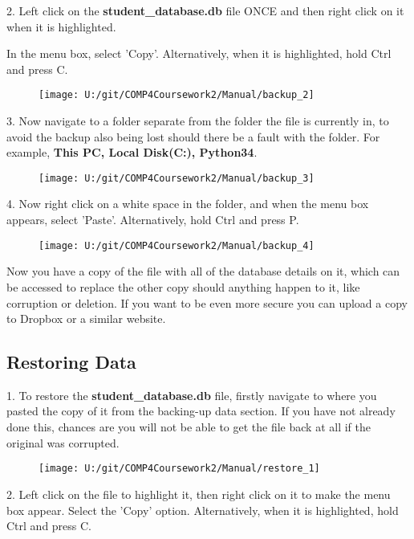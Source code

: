 2. Left click on the \textbf{student\_database.db} file ONCE and then right click on it when it is highlighted.

In the menu box, select 'Copy'. Alternatively, when it is highlighted, hold Ctrl and press C.

\begin{figure}[H]
    \texttt{[image: U:/git/COMP4Coursework2/Manual/backup\_2]}
\end{figure}

3. Now navigate to a folder separate from the folder the file is currently in, to avoid the backup also being lost should there be a fault with the folder. For example, \textbf{This PC, Local Disk(C:), Python34}.

\begin{figure}[H]
    \texttt{[image: U:/git/COMP4Coursework2/Manual/backup\_3]}
\end{figure}

4. Now right click on a white space in the folder, and when the menu box appears, select 'Paste'.  Alternatively, hold Ctrl and press P.

\begin{figure}[H]
    \texttt{[image: U:/git/COMP4Coursework2/Manual/backup\_4]}
\end{figure}

Now you have a copy of the file with all of the database details on it, which can be accessed to replace the other copy should anything happen to it, like corruption or deletion. If you want to be even more secure you can upload a copy to Dropbox or a similar website.

\subsection{Restoring Data}

1. To restore the \textbf{student\_database.db} file, firstly navigate to where you pasted the copy of it from the backing-up data section. If you have not already done this, chances are you will not be able to get the file back at all if the original was corrupted.

\begin{figure}[H]
    \texttt{[image: U:/git/COMP4Coursework2/Manual/restore\_1]}
\end{figure}

2. Left click on the file to highlight it, then right click on it to make the menu box appear. Select the 'Copy' option. Alternatively, when it is highlighted, hold Ctrl and press C.

